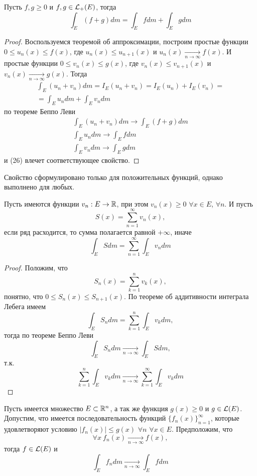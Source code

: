 \documentclass[main]{subfiles}
\begin{document}
\begin{corollary}
    Пусть $f, g \ge 0$ и $f,g \in \mathcal{L}_+(E)$, тогда
    \[\int_E (f+g) dm = \int_E fdm + \int_E gdm\]
\end{corollary}
\begin{proof}
    Воспользуемся теоремой об аппроксимации, построим простые функции $0 \le u_n(x) \le f(x)$, где $u_n(x) \le u_{n+1}(x)$ и $u_n(x) \xrightarrow[n \to \infty]{} f(x)$.
    И простые функции $0 \le v_n(x) \le g(x)$, где $v_n(x) \le v_{n+1}(x)$ и $v_n(x) \xrightarrow[n \to \infty]{} g(x)$.
    Тогда
    \begin{multline*}
        \int_E (u_n + v_n) dm = I_E(u_n + v_n) = I_E(u_n) + I_E(v_n) =\\
        = \int_E u_n dm + \int_E v_n dm \tag{26}
    \end{multline*}
    по теореме Беппо Леви
    \begin{gather*}
        \int_E (u_n + v_n) dm \to \int_E (f + g) dm \\
        \int_E u_n dm \to \int_E f dm \\
        \int_E v_n dm \to \int_E g dm
    \end{gather*}
    и (26) влечет соответствующее свойство.
\end{proof}
\begin{remark}
    Свойство сформулировано только для положительных функций, однако выполнено для любых.
\end{remark}

\begin{theorem}
    Пусть имеются функции $v_n: E \to \mathbb{R}$, при этом $v_n(x) \ge 0$ $\forall x \in E$, $\forall n$.
    И пусть
    \[S(x) = \sum_{n=1}^{\infty} v_n(x),\]
    если ряд расходится, то сумма полагается равной $+\infty$, иначе
    \[\int_E S dm  = \sum_{n=1}^{\infty} \int_E v_n dm\]
\end{theorem}
\begin{proof}
    Положим, что
    \[S_n(x) = \sum_{k=1}^{n} v_k(x),\]
    понятно, что $0 \le S_n(x) \le S_{n+1}(x)$.
    По теореме об аддитивности интеграла Лебега имеем
    \[\int_E S_n dm = \sum_{k=1}^{n} \int_E v_k dm,\]
    тогда по теореме Беппо Леви
    \[\int_E S_n dm \xrightarrow[n \to \infty]{} \int_E S dm, \]
    т.к.
    \[\sum_{k=1}^{n} \int_E v_k dm \xrightarrow[n \to \infty]{} \sum_{k=1}^{\infty} \int_E v_k dm\]
\end{proof}

\begin{theorem}
    Пусть имеется множество $E \subset \mathbb{R}^n$, а так же функция $g(x) \ge 0$ и $g \in \mathcal{L}(E)$.
    Допустим, что имеется последовательность функций $\{f_n(x)\}_{n=1}^\infty$, которые удовлетворяют условию $|f_n(x)| \le g(x)$ $\forall n$ $\forall x \in E$.
    Предположим, что
    \[\forall x\ f_n(x) \xrightarrow[n \to \infty]{} f(x),\]
    тогда $f \in \mathcal{L}(E)$ и
    \[\int_E f_n dm \xrightarrow[n \to \infty]{} \int_E f dm\]
\end{theorem}
\end{document}
